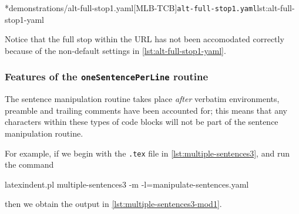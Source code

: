 	\begin{adjustwidth}{-3.5cm}{-1.5cm}
		\begin{minipage}{.6\linewidth}
		\end{minipage}
		\hfill
		\begin{minipage}{.4\linewidth}
			\cmhlistingsfromfile*[style=yaml-LST]*{demonstrations/alt-full-stop1.yaml}[MLB-TCB]{\texttt{alt-full-stop1.yaml}}{lst:alt-full-stop1-yaml}
		\end{minipage}
	\end{adjustwidth}

	Notice that the full stop within the URL has not been accomodated correctly because of the non-default settings in \cref{lst:alt-full-stop1-yaml}.

\subsubsection{Features of the \texttt{oneSentencePerLine} routine}
	The sentence manipulation routine takes place \emph{after} verbatim environments, preamble and trailing comments have been accounted for; this means that any characters within these types of code blocks will not be part of the sentence manipulation routine.

	For example, if we begin with the \texttt{.tex} file in \cref{lst:multiple-sentences3}, and run the command \begin{commandshell}
latexindent.pl multiple-sentences3 -m -l=manipulate-sentences.yaml
	\end{commandshell} then we obtain the output in \cref{lst:multiple-sentences3-mod1}.

